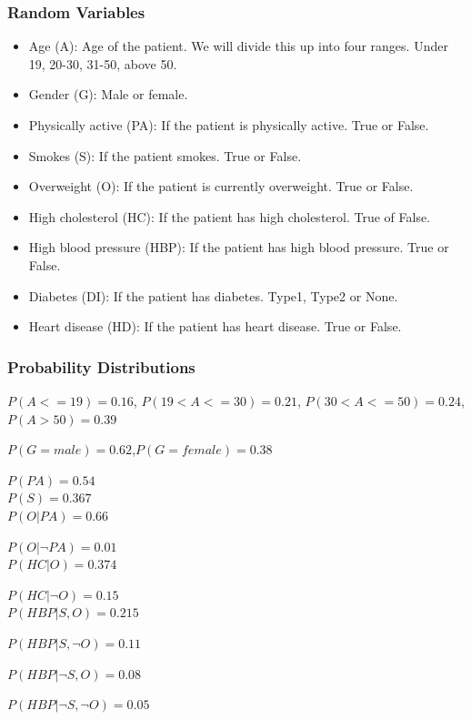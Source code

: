\documentclass{article}
\begin{document}
\subsubsection{Random Variables}
\begin{itemize}
\item Age (A): Age of the patient. We will divide this up into four ranges. Under 19, 20-30, 31-50, above 50.
\item Gender (G): Male or female.
\item Physically active (PA): If the patient is physically active. True or False.
\item Smokes (S): If the patient smokes. True or False.
\item Overweight (O): If the patient is currently overweight. True or False.
\item High cholesterol (HC): If the patient has high cholesterol. True of False.
\item High blood pressure (HBP): If the patient has high blood pressure. True or False.
\item Diabetes (DI): If the patient has diabetes. Type1, Type2 or None.
\item Heart disease (HD): If the patient has heart disease. True or False.
\end{itemize} 

\subsubsection{Probability Distributions}
$P(A <= 19) = 0.16$, $P(19 < A <= 30) = 0.21$, $P(30 < A <= 50) = 0.24$, $P(A > 50) = 0.39$ 

$P(G = male) = 0.62$,$P(G = female) = 0.38$

$P(PA) = 0.54$ \\

$P(S) = 0.367$ \\

$P(O | PA) = 0.66$

$P(O | \neg PA) = 0.01$\\


$P(HC | O) = 0.374$

$P(HC | \neg O) = 0.15$\\


$P(HBP | S, O) = 0.215$

$P(HBP | S, \neg O) = 0.11$

$P(HBP | \neg S, O) = 0.08$

$P(HBP | \neg S, \neg O) = 0.05$ \\
\end{document}
